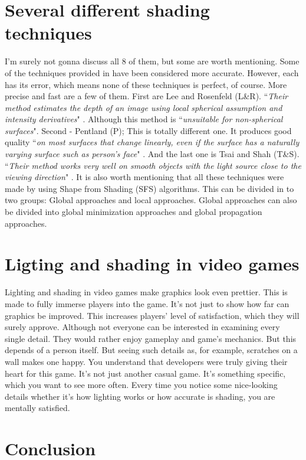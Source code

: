 \documentclass{scrartcl}
\begin{document}
\section{Several different shading techniques}
I'm surely not gonna discuss all 8 of them, but some are worth mentioning.
Some of the techniques provided in \cite{zhang1994analysis} have been considered more accurate.
However, each has its error, which means none of these techniques is perfect, of course.
More precise and fast are a few of them.
First are Lee and Rosenfeld (L\&R).
``\textit{Their method estimates the depth of an image using local spherical assumption and intensity derivatives}" \cite[p.~380]{zhang1994analysis}.
Although this method is ``\textit{unsuitable for non-spherical surfaces}".
Second - Pentland (P); This is totally different one.
It produces good quality ``\textit{on most surfaces that change linearly, even if the surface has a naturally varying surface such as person's face}" \cite[p.~380]{zhang1994analysis}.
And the last one is Tsai and Shah (T\&S).
``\textit{Their method works very well on smooth objects with the light source close to the viewing direction}" \cite[p.~381]{zhang1994analysis}.
It is also worth mentioning that all these techniques were made by using Shape from Shading (SFS) algorithms.
This can be divided in to two groups: Global approaches and local approaches.
Global approaches can also be divided into global minimization approaches and global propagation approaches.

\section{Ligting and shading in video games}
Lighting and shading in video games make graphics look even prettier.
This is made to fully immerse players into the game.
It's not just to show how far can graphics be improved.
This increases players' level of satisfaction, which they will surely approve.
Although not everyone can be interested in examining every single detail.
They would rather enjoy gameplay and game's mechanics.
But this depends of a person itself.
But seeing such details as, for example, scratches on a wall makes one happy.
You understand that developers were truly giving their heart for this game.
It's not just another casual game.
It's something specific, which you want to see more often.
Every time you notice some nice-looking details whether it's how lighting works or how accurate is shading, you are mentally satisfied.


\section{Conclusion}
\end{document}
